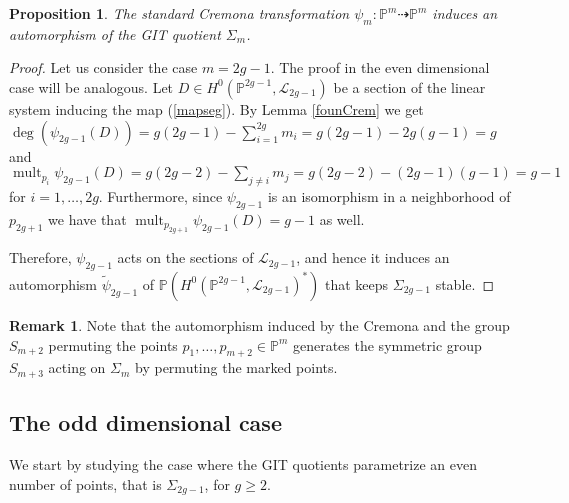\documentclass[a4paper,10pt]{amsart}
\newtheorem{Proposition}[thm]{Proposition}
\theoremstyle{definition}
\newtheorem{Remark}[thm]{Remark}
\DeclareMathOperator{\mult}{mult}
\begin{document}
\begin{Proposition}\label{autcrem}
The standard Cremona transformation $\psi_{m}:\mathbb{P}^{m}\dasharrow\mathbb{P}^{m}$ induces an automorphism of the GIT quotient $\Sigma_{m}$.
\end{Proposition}
\begin{proof}
Let us consider the case $m = 2g-1$. The proof in the even dimensional case will be analogous. Let $D\in H^0(\mathbb{P}^{2g-1},\mathcal{L}_{2g-1})$ be a section of the linear system inducing the map (\ref{mapseg}). By Lemma \ref{founCrem} we get $\deg(\psi_{2g-1}(D)) = g(2g-1)-\sum_{i=1}^{2g}m_i = g(2g-1)-2g(g-1)=g$
and $\mult_{p_i}\psi_{2g-1}(D) = g(2g-2)-\sum_{j\neq i}m_j = g(2g-2)-(2g-1)(g-1)=g-1$
for $i=1,\dots,2g$. Furthermore, since $\psi_{2g-1}$ is an isomorphism in a neighborhood of $p_{2g+1}$ we have that $\mult_{p_{2g+1}}\psi_{2g-1}(D)=g-1$ as well.

Therefore, $\psi_{2g-1}$ acts on the sections of $\mathcal{L}_{2g-1}$, and hence it induces an automorphism $\widetilde{\psi}_{2g-1}$ of $\mathbb{P}(H^0(\mathbb{P}^{2g-1},\mathcal{L}_{2g-1})^{*})$ that keeps $\Sigma_{2g-1}$ stable.
\end{proof}

\begin{Remark}\label{cremodd}
Note that the automorphism induced by the Cremona and the group $S_{m+2}$ permuting the points $p_1,\dots,p_{m+2}\in\mathbb{P}^{m}$ generates the symmetric group $S_{m+3}$ acting on $\Sigma_{m}$ by permuting the marked points.
\end{Remark}

\subsection{The odd dimensional case}\label{oddismi}
We start by studying the case where the GIT quotients parametrize an even number of points, that is $\Sigma_{2g-1}$, for $g\geq 2$. 
\end{document}
